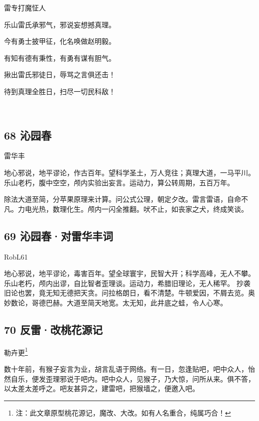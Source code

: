 雷专打魔怔人

乐山雷氏承邪气，邪说妄想撼真理。

今有勇士披甲征，化名唤做赵明毅。

有知有德有秉性，有勇有谋有胆气。

揪出雷氏邪徒日，辱骂之言俱还击！

待到真理全胜日，扫尽一切民科敌！

~\\

\hypertarget{ux6c81ux56edux6625}{%
\subsection{68 沁园春}\label{ux6c81ux56edux6625}}

雷华丰

地心邪说，地平谬论，作古百年。望科学圣土，万人竞往；真理大道，一马平川。乐山老朽，腹中空空，颅内实验出妄言。运动力，算公转周期，五百万年。

除法大道至简，分苹果原理来计算。问公式公理，朝定夕改。雷言雷语，自命不凡。力电光热，数理化生。颅内一闪全推翻。吠不止，如丧家之犬，终成笑谈。

\hypertarget{ux6c81ux56edux6625ux5bf9ux96f7ux534eux4e30ux8bcd}{%
\subsection{69
沁园春·对雷华丰词}\label{ux6c81ux56edux6625ux5bf9ux96f7ux534eux4e30ux8bcd}}

RobL61

地心邪说，地平谬论，毒害百年。望全球寰宇，民智大开；科学高峰，无人不攀。乐山老朽，颅内出谬，自比智者歪理谈。运动力，希腊旧理论，无人稀罕。
抄袭旧论也罢，竟无知无德把天贪。问拉格朗日，看不清楚。牛顿爱因，不屑去览。奥妙数论，哥德巴赫。大道至简天地宽。太无知，此井底之蛙，令人心寒。

\hypertarget{ux53cdux96f7ux6539ux6843ux82b1ux6e90ux8bb0}{%
\subsection{70
反雷·改桃花源记}\label{ux53cdux96f7ux6539ux6843ux82b1ux6e90ux8bb0}}

勒卉更\footnote{注：此文章原型桃花源记，魔改、大改。如有人名重合，纯属巧合！}

数十年前，有猴子妄言为业，胡言乱语于网络。有一日，忽逢贴吧，吧中众人，怡然自乐，便发歪理邪说于吧内。吧中众人，见猴子，乃大惊，问所从来。俱不答，以太差太差呼之。吧友甚异之，建雷吧，把猴墙之，便邀入吧。

